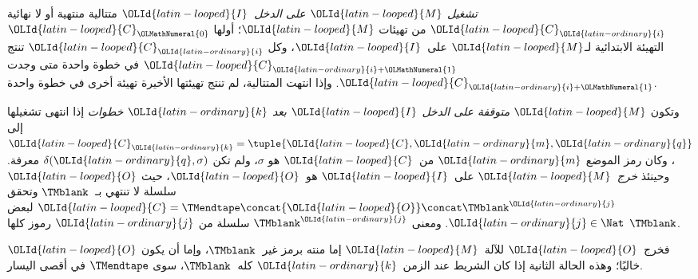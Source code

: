 \documentclass[../../../include/open-logic-section]{subfiles}
\begin{document}
\begin{defn}
\emph{تشغيل ${\OLId{latin-looped}{M}}$ على الدخل~${\OLId{latin-looped}{I}}$} متتالية منتهية أو لا نهائية ${\OLId{latin-looped}{C}}_{\OLId{latin-ordinary}{i}}$ من تهيئات ${\OLId{latin-looped}{M}}$؛ أولها ${\OLId{latin-looped}{C}}_{\OLMathNumeral{0}}$ التهيئة الابتدائية لـ${\OLId{latin-looped}{M}}$ على~${\OLId{latin-looped}{I}}$، وكل ${\OLId{latin-looped}{C}}_{\OLId{latin-ordinary}{i}}$ تنتج ${\OLId{latin-looped}{C}}_{{\OLId{latin-ordinary}{i}}+{\OLMathNumeral{1}}}$ في خطوة واحدة متى وجدت ${\OLId{latin-looped}{C}}_{{\OLId{latin-ordinary}{i}}+{\OLMathNumeral{1}}}$. وإذا انتهت المتتالية، لم تنتج تهيئتها الأخيرة تهيئة أخرى في خطوة واحدة.

وتكون ${\OLId{latin-looped}{M}}$ \emph{متوقفة على الدخل ${\OLId{latin-looped}{I}}$ بعد ${\OLId{latin-ordinary}{k}}$ خطوات} إذا انتهى تشغيلها إلى ${\OLId{latin-looped}{C}}_{\OLId{latin-ordinary}{k}}=\tuple{{\OLId{latin-looped}{C}},{\OLId{latin-ordinary}{m}},{\OLId{latin-ordinary}{q}}}$، وكان رمز الموضع ${\OLId{latin-ordinary}{m}}$ من~${\OLId{latin-looped}{C}}$ هو $\sigma$، ولم تكن $\delta({\OLId{latin-ordinary}{q}},\sigma)$ معرفة. وحينئذ \emph{خرج}~${\OLId{latin-looped}{M}}$ على~${\OLId{latin-looped}{I}}$ هو~${\OLId{latin-looped}{O}}$، حيث ${\OLId{latin-looped}{O}}$ سلسلة لا تنتهي بـ~$\TMblank$ وتحقق ${\OLId{latin-looped}{C}}=\TMendtape\concat {\OLId{latin-looped}{O}}\concat\TMblank^{\OLId{latin-ordinary}{j}}$ لبعض ${\OLId{latin-ordinary}{j}} \in \Nat$. ومعنى $\TMblank^{\OLId{latin-ordinary}{j}}$ سلسلة من ${\OLId{latin-ordinary}{j}}$ رموز كلها $\TMblank$.
\end{defn}

\begin{explain}
فخرج~${\OLId{latin-looped}{O}}$ للآلة~${\OLId{latin-looped}{M}}$ إما منته برمز غير~$\TMblank$، وإما أن يكون ${\OLId{latin-looped}{O}}$ خاليًا؛ وهذه الحالة الثانية إذا كان الشريط عند الزمن~${\OLId{latin-ordinary}{k}}$ كله~$\TMblank$، سوى $\TMendtape$ في أقصى اليسار.
\end{explain}
\end{document}
